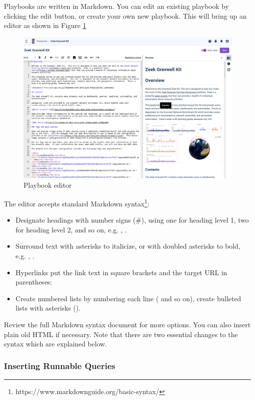 Playbooks are written in Markdown. You can edit an existing playbook by clicking the edit button, or create your own new playbook. This will bring up an editor as shown in Figure \ref{fig:playbook-edit}

\begin{figure}
	\includegraphics[width=0.8\linewidth]{images/playbook-edit.png}
	\caption{Playbook editor}
	\label{fig:playbook-edit}
\end{figure}

The editor accepts standard Markdown syntax\footnote{https://www.markdownguide.org/basic-syntax/}:

\begin{itemize}
\item Designate headings with number signs (\#), using one for heading level 1, two for heading level 2, and so on, e.g. , .
\item Surround text with asterisks to italicize, or with doubled asterisks to bold, e.g. , .
\item Hyperlinks put the link text in square brackets and the target URL in parentheses: 
\item Create numbered lists by numbering each line ( and so on), create bulleted lists with asterisks ().
\end{itemize}

Review the full Markdown syntax document for more options. You can also insert plain old HTML if necessary. Note that there are two essential changes to the syntax which are explained below.

\subsubsection{Inserting Runnable Queries}

